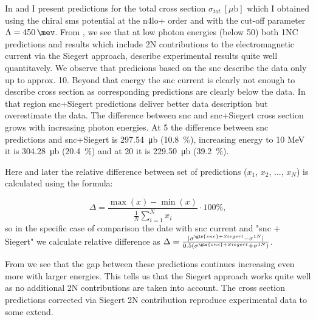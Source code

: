     In  and  
    I present predictions for the
    total cross section $\sigma_{tot}~[\mu\text{b}]$ which I obtained
    using the chiral \gls{sms} potential at the \gls{n4lo+} order and with 
    the cut-off parameter $\Lambda=\SI{450}{\mev}$.
    From , we see that at low photon energies
    (below \SI{50}{\mev})
    both 1NC predictions and results which include 2N contributions
    to the electromagnetic current
    via the Siegert approach, describe experimental results quite well quantitavely.
    We observe that predicions based on the \gls{snc} describe the data 
    only up to approx. \SI{10}{\mev}.
    Beyond that energy
    the \gls{snc} current is clearly not enough
    to describe cross section 
    as corresponding predictions are clearly below the data.
    In that region \gls{snc}+Siegert predictions deliver better data description but 
    overestimate the data.
    The difference between \gls{snc} and \gls{snc}+Siegert cross section grows with increasing photon energies.
    At \SI{5}{\mev} the difference between \gls{snc} predictions
    and \gls{snc}+Siegert is \SI{297.54}{\micro\barn} (\SI{10.8}{\percent}), increasing energy to 10 MeV
    it is \SI{304.28}{\micro\barn} (\SI{20.4}{\percent})
    and at \SI{20}{\mev} it is \SI{229.50}{\micro\barn} (\SI{39.2}{\percent}).
    
    Here and later the relative difference between set of predictions ($x_1$, $x_2$, ..., $x_N$) is calculated
    using the formula:

    \begin{equation}
        \Delta = \frac{\max(x) - \min(x)}{\frac{1}{N}\sum_{i=1}^N x_i} \cdot 100\%,
        \label{eq:relative_diff}
    \end{equation}
    so in the specific case of comparison the date with \gls{snc} current and "\gls{snc} + Siegert" we
    calculate relative difference as 
    $\Delta = \frac{|\sigma^{\gls{snc}+Siegert} - \sigma^{1N}|}{0.5(\sigma^{\gls{snc}+Siegert} + \sigma^{1N})}$.
    
    From  we see that the gap between these predictions
    continues increasing even more with larger energies.
    This tells us that the Siegert approach works quite well as no additional 2N contributions are taken into account.
    The cross section predictions corrected via Siegert 2N contribution  reproduce 
    experimental data to some extend.
    

